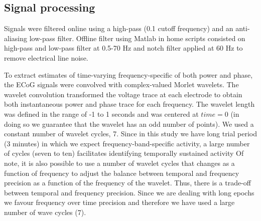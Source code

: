 \documentclass[11pt, onecolumn]{article}
\begin{document}
\subsection{Signal processing}
Signals were filtered online using a high-pass (0.1 cutoff frequency) and an anti-aliasing low-pass filter. %
Offline filter using Matlab in home scripts consisted on high-pass and low-pass filter at 0.5-70 Hz and notch filter applied at 60 Hz to remove electrical line noise.

To extract estimates of time-varying frequency-specific of both power and phase, the ECoG signals were convolved with complex-valued Morlet wavelets. %
The  wavelet convolution transformed the voltage trace at each electrode to obtain both instantaneous power and phase trace for each frequency.
The wavelet length was defined in the range of -1 to 1 seconds and was centered at $time = 0$ (in doing so we guarantee that the wavelet has an odd number of points). 
We used a constant number of wavelet cycles, 7. Since in this study we have long trial period (3 minutes) in which we expect frequency-band-specific activity, a large number of cycles (seven to ten) facilitates identifying temporally sustained activity \citep{cohen2014analyzing} Of note, it is also possible to use a number of wavelet cycles that changes as a function of frequency to adjust the balance between temporal and frequency precision as a function of the frequency of the wavelet. Thus, there is a trade-off between temporal and frequency precision. Since we are dealing with long epochs we favour frequency over time precision and therefore we have used a large number of wave cycles (7).
\end{document}
